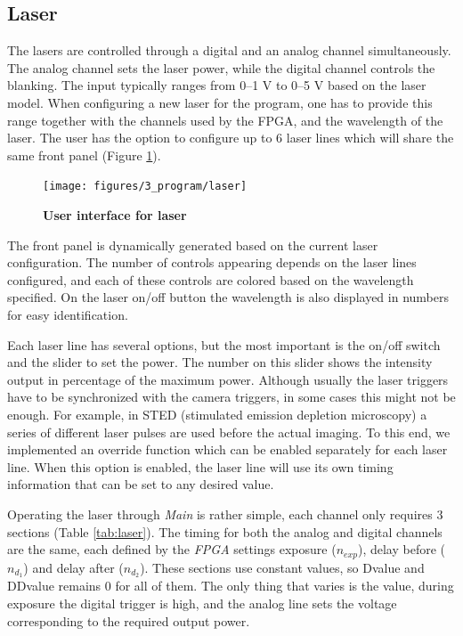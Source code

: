 \documentclass{tdk_style}
\begin{document}
\subsection{Laser}
\label{laser}
The lasers are controlled through a digital and an analog channel simultaneously. The analog channel sets the laser power, while the digital channel controls the blanking. The input typically ranges from 0--1 V to 0--5 V based on the laser model. When configuring a new laser for the program, one has to provide this range together with the channels used by the FPGA, and the wavelength of the laser. The user has the option to configure up to 6 laser lines which will share the same front panel (Figure \ref{fig:ui_laser}).

\begin{figure}[htbp]
	\centering
	\texttt{[image: figures/3\_program/laser]}
	\caption{\textbf{User interface for laser}}
	\label{fig:ui_laser}
\end{figure}
The front panel is dynamically generated based on the current laser configuration. The number of controls appearing depends on the laser lines configured, and each of these controls are colored based on the wavelength specified. On the laser on/off button the wavelength is also displayed in numbers for easy identification.

Each laser line has several options, but the most important is the on/off switch and the slider to set the power. The number on this slider shows the intensity output in percentage of the maximum power. Although usually the laser triggers have to be synchronized with the camera triggers, in some cases this might not be enough. For example, in STED (stimulated emission depletion microscopy) \cite{hell_breaking_1994} a series of different laser pulses are used before the actual imaging. To this end, we implemented an override function which can be enabled separately for each laser line. When this option is enabled, the laser line will use its own timing information that can be set to any desired value.


Operating the laser through \emph{Main} is rather simple, each channel only requires 3 sections (Table \ref{tab:laser}). The timing for both the analog and digital channels are the same, each defined by the \emph{FPGA} settings exposure ($n_{exp}$), delay before ($n_{d_1}$) and delay after ($n_{d_2}$). These sections use constant values, so Dvalue and DDvalue remains 0 for all of them. The only thing that varies is the value, during exposure the digital trigger is high, and the analog line sets the voltage corresponding to the required output power.
\end{document}
